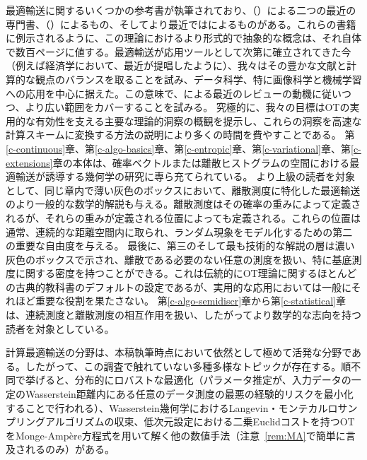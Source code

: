 最適輸送に関するいくつかの参考書が執筆されており、\citeauthor{Villani03}（\citeyear{Villani03,Villani09}）による二つの最近の専門書、\citeauthor{rachev1998mass}（\citeyear{rachev1998mass,rachev1998mass2}）によるもの、そしてより最近では\citet{SantambrogioBook}によるものがある。これらの書籍に例示されるように、この理論におけるより形式的で抽象的な概念は、それ自体で数百ページに値する。最適輸送が応用ツールとして次第に確立されてきた今（例えば経済学において、最近\citet{galichon2016optimal}が提唱したように）、我々はその豊かな文献と計算的な観点のバランスを取ることを試み、データ科学、特に画像科学と機械学習への応用を中心に据えた。この意味で、\citet{kolouri2017optimal}による最近のレビューの動機に従いつつ、より広い範囲をカバーすることを試みる。
%
究極的に、我々の目標はOTの実用的な有効性を支える主要な理論的洞察の概観を提示し、これらの洞察を高速な計算スキームに変換する方法の説明により多くの時間を費やすことである。
%
第\ref{c-continuous}章、第\ref{c-algo-basics}章、第\ref{c-entropic}章、第\ref{c-variational}章、第\ref{c-extensions}章の本体は、確率ベクトルまたは離散ヒストグラムの空間における最適輸送が誘導する幾何学の研究に専ら充てられている。
%
より上級の読者を対象として、同じ章内で薄い灰色のボックスにおいて、離散測度に特化した最適輸送のより一般的な数学的解説も与える。離散測度はその確率の重みによって定義されるが、それらの重みが定義される位置によっても定義される。これらの位置は通常、連続的な距離空間内に取られ、ランダム現象をモデル化するための第二の重要な自由度を与える。
%
最後に、第三のそして最も技術的な解説の層は濃い灰色のボックスで示され、離散である必要のない任意の測度を扱い、特に基底測度に関する密度を持つことができる。これは伝統的にOT理論に関するほとんどの古典的教科書のデフォルトの設定であるが、実用的な応用においては一般にそれほど重要な役割を果たさない。
%
第\ref{c-algo-semidiscr}章から第\ref{c-statistical}章は、連続測度と離散測度の相互作用を扱い、したがってより数学的な志向を持つ読者を対象としている。

計算最適輸送の分野は、本稿執筆時点において依然として極めて活発な分野である。したがって、この調査で触れていない多種多様なトピックが存在する。順不同で挙げると、分布的にロバストな最適化\citep{NIPS2015_5745,esfahani2018data,NIPS2018_7534,NIPS2018_8015}（パラメータ推定が、入力データの一定のWasserstein距離内にある任意のデータ測度の最悪の経験的リスクを最小化することで行われる）、Wasserstein幾何学におけるLangevin・モンテカルロサンプリングアルゴリズムの収束\citep{dalalyan2017user,pmlr-v65-dalalyan17a,pmlr-v75-bernton18a}、低次元設定における二乗Euclidコストを持つOTをMonge-Ampère方程式を用いて解く他の数値手法\citep{froese2011convergent,benamou2014numerical,sulman2011efficient}（注意~\ref{rem:MA}で簡単に言及されるのみ）がある。


